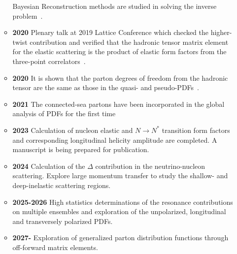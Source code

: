 \documentclass[12pt,hyperpdf]{article}
\begin{document}
\begin{itemize}
\begin{itemize}
      Bayesian Reconstruction methods are studied in solving the
      inverse problem~\cite{Liang:2019frk}. 
    \item{\bf 2020} Plenary talk at 2019 Lattice Conference which checked
      the higher-twist contribution and verified that the hadronic
      tensor matrix element for the elastic scattering is the product
      of elastic form factors from the three-point
      correlators~\cite{Liang:2020sqi}. 
    \item{\bf 2020} It is shown that the parton degrees of freedom from
      the hadronic tensor are the same as those in the quasi- and
      pseudo-PDFs~\cite{Liu:2020okp}. 
    \item{\bf 2021} The connected-sea partons have been incorporated in
      the global analysis of PDFs for the first
      time~\cite{Hou:2022ajg}
    \item{\bf 2023} Calculation of nucleon elastic and $N\to N^*$
      transition form factors and corresponding longitudinal helicity
      amplitude are completed. A manuscript is being prepared for
      publication. 
    \item{\bf 2024} Calculation of the $\Delta$ contribution in the
      neutrino-nucleon scattering. Explore large momentum transfer to
      study the shallow- and deep-inelastic scattering regions. 
    \item{\bf 2025-2026} High statistics determinations of the resonance
      contributions on multiple ensembles and exploration of 
    the unpolarized, longitudinal and transversely polarized PDFs.
    \item{\bf 2027-} Exploration of generalized parton distribution
      functions through off-forward matrix elements. 
\end{itemize}
\end{itemize}


\end{document}
